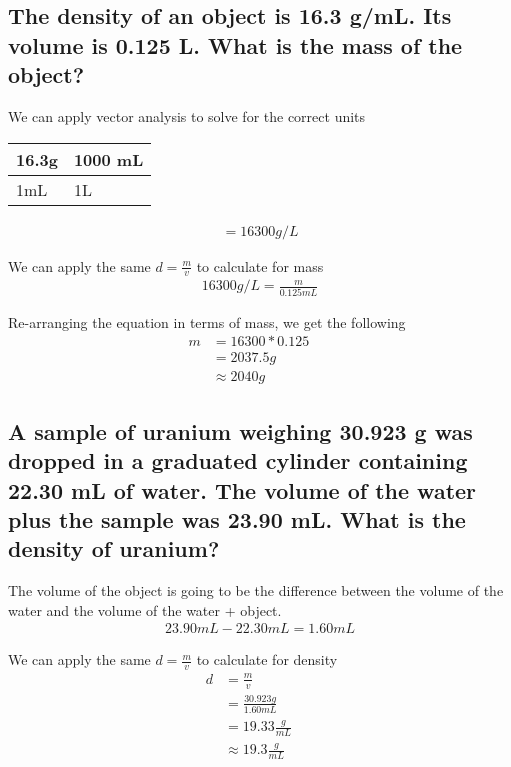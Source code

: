 \documentclass[11pt]{article}
\begin{document}
\subsection{The density of an object is 16.3 g/mL. Its volume is 0.125 L. What is the mass of the object?}
\label{sec:orge82f47b}
We can apply vector analysis to solve for the correct units

\begin{center}
\begin{tabular}{ll}
16.3g & 1000 mL\\
\hline
1mL & 1L\\
\end{tabular}
\end{center}
\begin{align*}
=16300{g}/{L}
\end{align*}

We can apply the same \(d=\frac{m}{v}\) to calculate for mass
\begin{align*}
16300{g}/{L}=\frac{m}{0.125mL}
\end{align*}

Re-arranging the equation in terms of mass, we get the following
\begin{align}
m &= 16300 * 0.125&&\\\nonumber
            &= 2037.5g&&\\\nonumber
            &\approx 2040g&&
\end{align}

\subsection{A sample of uranium weighing 30.923 g was dropped in a graduated cylinder containing 22.30 mL of water. The volume of the water plus the sample was 23.90 mL. What is the density of uranium?}
\label{sec:org6a6468e}

The volume of the object is going to be the difference between the volume of the water and the volume of the water + object.
\begin{align*}
23.90mL - 22.30mL = 1.60mL
\end{align*}

We can apply the same \(d=\frac{m}{v}\) to calculate for density
\begin{align}
d&=\frac{m}{v} &&\\\nonumber
            &=\frac{30.923g}{1.60mL}&&\\\nonumber
            &=19.33\frac{g}{mL}&&\\\nonumber
            &\approx19.3\frac{g}{mL}&&
\end{align}
\end{document}
